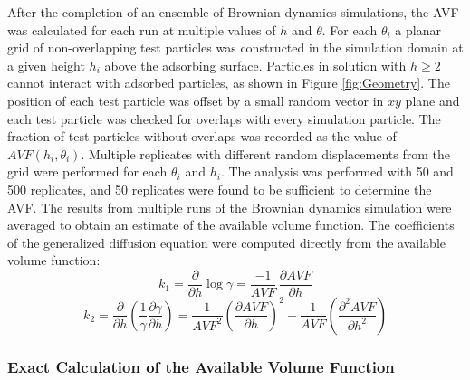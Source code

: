 After the completion of an ensemble of Brownian dynamics simulations,
the AVF was calculated for each run at multiple values of $h$ and
$\theta$. For each $\theta_{i}$ a planar grid of non-overlapping
test particles was constructed in the simulation domain at a given
height $h_{i}$ above the adsorbing surface. Particles in solution
with $h\geq2$ cannot interact with adsorbed particles, as shown in
Figure \ref{fig:Geometry}. The position of each test particle was
offset by a small random vector in $xy$ plane and each test particle
was checked for overlaps with every simulation particle. The fraction
of test particles without overlaps was recorded as the value of $AVF\left(h_{i},\theta_{i}\right)$.
Multiple replicates with different random displacements from the grid
were performed for each $\theta_{i}$ and $h_{i}$. The analysis was
performed with 50 and 500 replicates, and 50 replicates were found
to be sufficient to determine the AVF. The results from multiple runs
of the Brownian dynamics simulation were averaged to obtain an estimate
of the available volume function. The coefficients of the generalized
diffusion equation were computed directly from the available volume
function:\[
k_{1}=\frac{\partial}{\partial h}\log\gamma=\frac{-1}{AVF}\,\frac{\partial AVF}{\partial h}\]
\[
k_{2}=\frac{\partial}{\partial h}\left(\frac{1}{\gamma}\frac{\partial\gamma}{\partial h}\right)=\frac{1}{AVF^{2}}\left(\frac{\partial AVF}{\partial h}\right)^{2}-\frac{1}{AVF}\left(\frac{\partial^{2}AVF}{\partial h^{2}}\right)\]



\subsubsection{Exact Calculation of the Available Volume Function}

